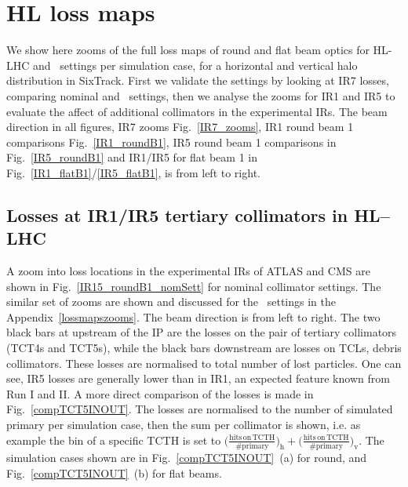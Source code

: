 \section{HL loss maps \label{lossmapszooms}}

We show here zooms of the full loss maps of round and flat beam optics for HL-LHC and \twosigmaret~settings per simulation case, for a horizontal and vertical halo distribution in SixTrack. First we validate the settings by looking at IR7 losses, comparing nominal and \twosigmaret~settings, then we analyse the zooms for IR1 and IR5 to evaluate the affect of additional collimators in the experimental IRs. The beam direction in all figures, IR7 zooms Fig.~\ref{IR7_zooms}, IR1 round beam 1 comparisons Fig.~\ref{IR1_roundB1}, IR5 round beam 1 comparisons in Fig.~\ref{IR5_roundB1} and IR1/IR5 for flat beam 1 in Fig.~\ref{IR1_flatB1}/\ref{IR5_flatB1}, is from left to right. 

\subsection{Losses at IR1/IR5 tertiary collimators in HL--LHC}

A zoom into loss locations in the experimental IRs of ATLAS and CMS are shown in Fig.~\ref{IR15_roundB1_nomSett} for nominal collimator settings. The similar set of zooms are shown and discussed for the \twosigmaret~settings in the Appendix~\ref{lossmapszooms}. The beam direction is from left to right. The two black bars at upstream of the IP are the losses on the pair of tertiary collimators (TCT4s and TCT5s), while the black bars downstream are losses on TCLs, debris collimators. These losses are normalised to total number of lost particles. One can see, IR5 losses are generally lower than in IR1, an expected feature known from Run I and II. A more direct comparison of the losses is made in Fig.~\ref{compTCT5INOUT}. The losses are normalised to the number of simulated primary per simulation case, then the sum per collimator is shown, i.e. as example the bin of a specific TCTH is set to $\big(\frac{\mathrm{hits\,on\,TCTH}}{\#\mathrm{primary}}\big)_{\mathrm{h}} + \big(\frac{\mathrm{hits\,on\,TCTH}}{\#\mathrm{primary}}\big)_{\mathrm{v}}$. The simulation cases shown are in Fig.~\ref{compTCT5INOUT}~(a) for round, and Fig.~\ref{compTCT5INOUT}~(b) for flat beams.


